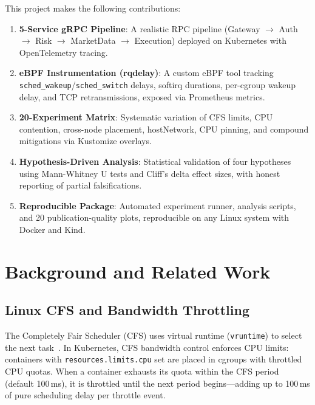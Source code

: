\documentclass[11pt,a4paper]{article}
\begin{document}
This project makes the following contributions:

\begin{enumerate}[leftmargin=*]
  \item \textbf{5-Service gRPC Pipeline}: A realistic RPC pipeline (Gateway $\to$ Auth $\to$ Risk $\to$ MarketData $\to$ Execution) deployed on Kubernetes with OpenTelemetry tracing.

  \item \textbf{eBPF Instrumentation (rqdelay)}: A custom eBPF tool tracking \texttt{sched\_wakeup}/\texttt{sched\_switch} delays, softirq durations, per-cgroup wakeup delay, and TCP retransmissions, exposed via Prometheus metrics.

  \item \textbf{20-Experiment Matrix}: Systematic variation of CFS limits, CPU contention, cross-node placement, hostNetwork, CPU pinning, and compound mitigations via Kustomize overlays.

  \item \textbf{Hypothesis-Driven Analysis}: Statistical validation of four hypotheses using Mann-Whitney U tests and Cliff's delta effect sizes, with honest reporting of partial falsifications.

  \item \textbf{Reproducible Package}: Automated experiment runner, analysis scripts, and 20 publication-quality plots, reproducible on any Linux system with Docker and Kind.
\end{enumerate}


\section{Background and Related Work}
\label{sec:background}

\subsection{Linux CFS and Bandwidth Throttling}

The Completely Fair Scheduler (CFS) uses virtual runtime (\texttt{vruntime}) to select the next task~\cite{fleming2017cfs}. In Kubernetes, CFS bandwidth control enforces CPU limits: containers with \texttt{resources.limits.cpu} set are placed in cgroups with throttled CPU quotas. When a container exhausts its quota within the CFS period (default 100\,ms), it is throttled until the next period begins---adding up to 100\,ms of pure scheduling delay per throttle event.
\end{document}
